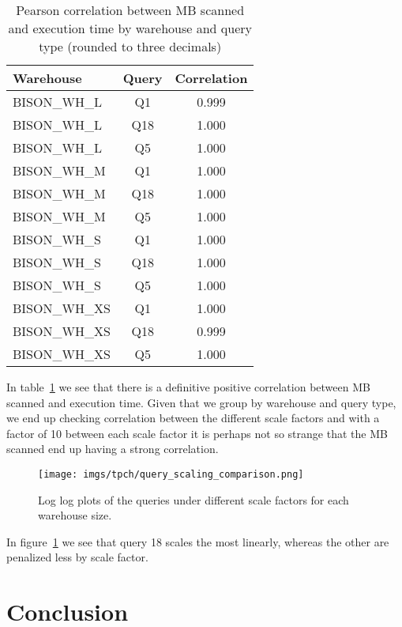 \documentclass{article}
\begin{document}
\begin{table}[htbp]
    \centering
    \begin{tabular}{lcc}
        \toprule
        \textbf{Warehouse} & \textbf{Query} & \textbf{Correlation} \\
        \midrule
        BISON\_WH\_L & Q1 & 0.999 \\
        BISON\_WH\_L & Q18 & 1.000 \\
        BISON\_WH\_L & Q5 & 1.000 \\
        \midrule
        BISON\_WH\_M & Q1 & 1.000 \\
        BISON\_WH\_M & Q18 & 1.000 \\
        BISON\_WH\_M & Q5 & 1.000 \\
        \midrule
        BISON\_WH\_S & Q1 & 1.000 \\
        BISON\_WH\_S & Q18 & 1.000 \\
        BISON\_WH\_S & Q5 & 1.000 \\
        \midrule
        BISON\_WH\_XS & Q1 & 1.000 \\
        BISON\_WH\_XS & Q18 & 0.999 \\
        BISON\_WH\_XS & Q5 & 1.000 \\
        \bottomrule
    \end{tabular}
    \caption{Pearson correlation between MB scanned and execution time by warehouse and query type (rounded to three decimals)}
    \label{tab:tpch_mbscanned_executiontime_correlations}
\end{table}

In table~\ref{tab:tpch_mbscanned_executiontime_correlations} we see that there is a definitive positive correlation between MB scanned and execution time. Given that we group by warehouse and query type, we end up checking correlation between the different scale factors and with a factor of 10 between each scale factor it is perhaps not so strange that the MB scanned end up having a strong correlation. 

\medskip \noindent 

\begin{figure}[htbp]
    \centering
    \texttt{[image: imgs/tpch/query\_scaling\_comparison.png]}
    \caption{Log log plots of the queries under different scale factors for each warehouse size. }
    \label{fig:query_scaling_comp}
\end{figure}

In figure~\ref{fig:query_scaling_comp} we see that query 18 scales the most linearly, whereas the other are penalized less by scale factor. 

\FloatBarrier


\section{Conclusion}

\newpage


\end{document}
